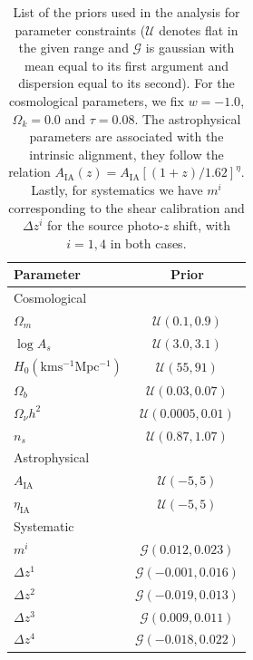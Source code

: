 \documentclass[twocolumn]{\docclass}
\begin{document}
	\begin{table}
		\centering
		\begin{tabular} { l c} 
			\hline
			\hline
			Parameter							& Prior	\\ \hline
			Cosmological & \\ [1ex]
			$\Omega_m$						& $\mathcal{U}(0.1, 0.9)$		\\
			$\log A_s$					& $\mathcal{U}(3.0, 3.1)$		\\
			$H_0 \mathrm{(km s^{-1} Mpc^{-1})}$	& $\mathcal{U}(55, 91)$		\\
			$\Omega_b$						& $\mathcal{U}(0.03, 0.07)$	\\
			$\Omega_\nu h^2$					& $\mathcal{U}(0.0005, 0.01)$	\\
			$n_s$							& $\mathcal{U}(0.87, 1.07)$	\\ [1ex]
			\hline
			Astrophysical & \\ [1ex]
			$A_{\mathrm{IA}}$								& $\mathcal{U}(-5, 5)$ \\
			$\eta_{\mathrm{IA}}$							& $\mathcal{U}(-5, 5)$ \\ [1ex]
			\hline
			Systematic & \\ [1ex]
			$m^i$							& $\mathcal{G}(0.012, 0.023)$	 \\
			$\Delta z^1$						& $\mathcal{G}(-0.001, 0.016)$	 \\
			$\Delta z^2$						& $\mathcal{G}(-0.019, 0.013)$	 \\
			$\Delta z^3$						& $\mathcal{G}(0.009, 0.011)$	 \\
			$\Delta z^4$						& $\mathcal{G}(-0.018, 0.022)$	 \\ [1ex]
			\hline
			\hline
		\end{tabular}
		\caption{List of the priors used in the analysis for parameter constraints ($\mathcal{U}$ denotes flat in the given range and $\mathcal{G}$ is gaussian with mean equal to its first argument and dispersion equal to its second). For the cosmological parameters, we fix $w = -1.0$, $\Omega_k =  0.0$ and $\tau =  0.08$. The astrophysical parameters are associated with the intrinsic alignment, they follow the relation $A_{\mathrm{IA}}(z) = A_{\mathrm{IA}}[(1+z)/1.62]^{\eta}$. Lastly, for systematics we have $m^i$ corresponding to the shear calibration and  $\Delta z^i$ for the source photo-$z$ shift, with $i = 1, 4$ in both cases.}
		\label{tab:priors}
	\end{table}
	
\end{document}
